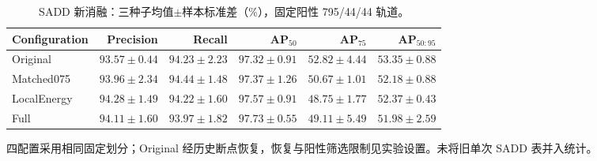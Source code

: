 \begin{table}[tp]
\centering\small
\setlength{\tabcolsep}{4pt}
\caption{SADD 新消融：三种子均值$\pm$样本标准差（\%），固定阳性 795/44/44 轨道。}\label{tab:sadd_current}
\begin{tabular*}{\textwidth}{@{\extracolsep{\fill}}lrrrrr}
\toprule
Configuration & Precision & Recall & AP$_{50}$ & AP$_{75}$ & AP$_{50:95}$\\
\midrule
Original & $93.57\pm0.44$ & $94.23\pm2.23$ & $97.32\pm0.91$ & $52.82\pm4.44$ & $53.35\pm0.88$ \\
Matched075 & $93.96\pm2.34$ & $94.44\pm1.48$ & $97.37\pm1.26$ & $50.67\pm1.01$ & $52.18\pm0.88$ \\
LocalEnergy & $94.28\pm1.49$ & $94.22\pm1.60$ & $97.57\pm0.91$ & $48.75\pm1.77$ & $52.37\pm0.43$ \\
Full & $94.11\pm1.60$ & $93.97\pm1.82$ & $97.73\pm0.55$ & $49.11\pm5.49$ & $51.98\pm2.59$ \\
\bottomrule
\end{tabular*}
\smallskip
\begin{minipage}{\linewidth}\footnotesize
四配置采用相同固定划分；Original 经历史断点恢复，恢复与阳性筛选限制见实验设置。未将旧单次 SADD 表并入统计。
\end{minipage}
\end{table}
